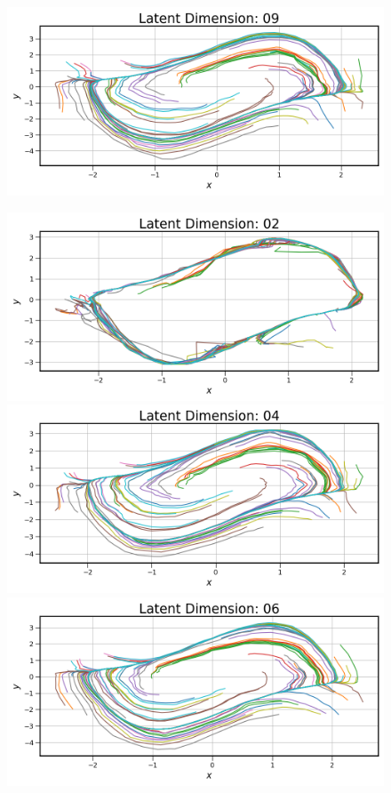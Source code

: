 \begin{figure}[!htbp]
\begin{minipage}{.5\textwidth}
        \includegraphics[width=\textwidth]{"../Figures/van_der_pol_trajectories_09.png"} 
    \end{minipage}%
    \begin{minipage}{.5\textwidth}
        \includegraphics[width=\textwidth]{"../Figures/van_der_pol_trajectories_02.png"} 
        \includegraphics[width=\textwidth]{"../Figures/van_der_pol_trajectories_04.png"} 
        \includegraphics[width=\textwidth]{"../Figures/van_der_pol_trajectories_06.png"} 

\end{minipage}
\end{figure}
